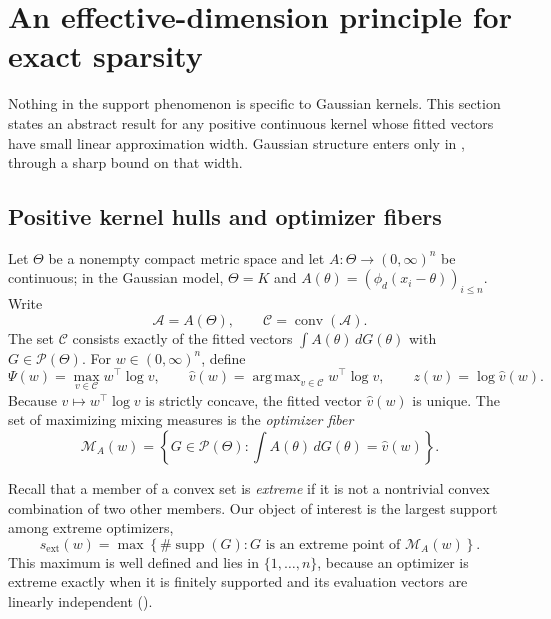 \documentclass[11pt]{article}
\theoremstyle{definition}
\theoremstyle{remark}
\DeclareMathOperator*{\argmax}{arg\,max}
\DeclareMathOperator{\conv}{conv}
\DeclareMathOperator{\supp}{supp}
\newcommand{\Pcal}{\mathcal P}
\newcommand{\Mcal}{\mathcal M}
\newcommand{\Ccal}{\mathcal C}
\newcommand{\Acal}{\mathcal A}
\newcommand{\vhat}{\widehat v}
\newcommand{\sext}{s_{\mathrm{ext}}}
\begin{document}
\section{An effective-dimension principle for exact sparsity}
\label{sec:effective}

Nothing in the support phenomenon is specific to Gaussian kernels.  This
section states an abstract result for any positive continuous kernel whose
fitted vectors have small linear approximation width.  Gaussian structure
enters only in , through a sharp bound on that width.

\subsection{Positive kernel hulls and optimizer fibers}

Let $\Theta$ be a nonempty compact metric space and let
$A:\Theta\to(0,\infty)^n$ be continuous; in the Gaussian model, $\Theta=K$
and $A(\theta)=(\phi_d(x_i-\theta))_{i\le n}$.  Write
\[
 \Acal=A(\Theta),\qquad \Ccal=\conv(\Acal).
\]
The set $\Ccal$ consists exactly of the fitted vectors
$\int A(\theta)\,dG(\theta)$ with $G\in\Pcal(\Theta)$.  For
$w\in(0,\infty)^n$, define
\begin{equation}\label{eq:value}
 \Psi(w)=\max_{v\in\Ccal}w^\top\log v,
 \qquad
 \vhat(w)=\argmax_{v\in\Ccal}w^\top\log v,
 \qquad z(w)=\log\vhat(w).
\end{equation}
Because $v\mapsto w^\top\log v$ is strictly concave, the fitted vector
$\vhat(w)$ is unique.  The set of maximizing mixing measures is the
\emph{optimizer fiber}
\begin{equation}\label{eq:fiber}
 \Mcal_A(w)=\left\{G\in\Pcal(\Theta):
       \int A(\theta)\,dG(\theta)=\vhat(w)\right\}.
\end{equation}

Recall that a member of a convex set is \emph{extreme} if it is not a
nontrivial convex combination of two other members.  Our object of interest
is the largest support among extreme optimizers,
\begin{equation}\label{eq:sext}
 \sext(w)=
 \max\left\{\#\supp(G):G\text{ is an extreme point of }\Mcal_A(w)\right\}.
\end{equation}
This maximum is well defined and lies in $\{1,\ldots,n\}$, because an
optimizer is extreme exactly when it is finitely supported and its
evaluation vectors are linearly independent ().
\end{document}
